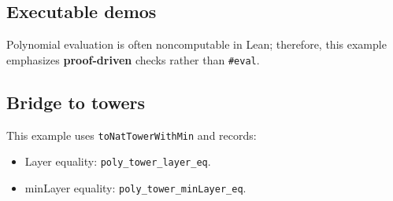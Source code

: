 \subsection{Executable demos}
Polynomial evaluation is often noncomputable in Lean; therefore, this example emphasizes
\textbf{proof-driven} checks rather than \texttt{\#eval}.

\subsection{Bridge to towers}
This example uses \texttt{toNatTowerWithMin} and records:
\begin{itemize}
\item Layer equality: \texttt{poly\_tower\_layer\_eq}.
\item minLayer equality: \texttt{poly\_tower\_minLayer\_eq}.
\end{itemize}

